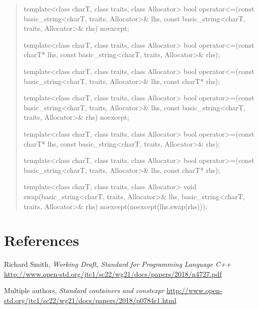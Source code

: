 \documentclass{wg21}
\begin{document}
\begin{quote}
\begin{itemdecl}
template<class charT, class traits, class Allocator>
  bool operator<=(const basic_string<charT, traits, Allocator>& lhs,
                  const basic_string<charT, traits, Allocator>& rhs) noexcept;
\end{itemdecl}

\begin{itemdecl}
template<class charT, class traits, class Allocator>
  bool operator<=(const charT* lhs, const basic_string<charT, traits, Allocator>& rhs);
\end{itemdecl}

\begin{itemdecl}
template<class charT, class traits, class Allocator>
  bool operator<=(const basic_string<charT, traits, Allocator>& lhs, const charT* rhs);
\end{itemdecl}

\begin{itemdecl}
template<class charT, class traits, class Allocator>
  bool operator>=(const basic_string<charT, traits, Allocator>& lhs,
                  const basic_string<charT, traits, Allocator>& rhs) noexcept;
\end{itemdecl}

\begin{itemdecl}
template<class charT, class traits, class Allocator>
  bool operator>=(const charT* lhs, const basic_string<charT, traits, Allocator>& rhs);
\end{itemdecl}

\begin{itemdecl}
template<class charT, class traits, class Allocator>
  bool operator>=(const basic_string<charT, traits, Allocator>& lhs, const charT* rhs);
\end{itemdecl}

\begin{itemdecl}
template<class charT, class traits, class Allocator>
  void swap(basic_string<charT, traits, Allocator>& lhs,
            basic_string<charT, traits, Allocator>& rhs)
    noexcept(noexcept(lhs.swap(rhs)));
\end{itemdecl}
\end{quote}

\section{References}
\renewcommand{\section}[2]{}%
\begin{thebibliography}{9}

  Richard Smith,
  \emph{Working Draft, Standard for Programming Language C++}\newline
  \url{http://www.open-std.org/jtc1/sc22/wg21/docs/papers/2018/n4727.pdf}

  Multiple authors,
  \emph{Standard containers and constexpr}\newline
  \url{http://www.open-std.org/jtc1/sc22/wg21/docs/papers/2018/p0784r1.html}

\end{thebibliography}
\end{document}
